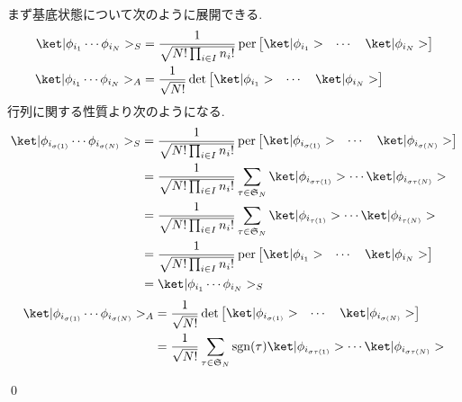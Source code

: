 \documentclass[uplatex,dvipdfmx,a4paper,11pt]{jlreq}
\makeatletter
\DeclareMathOperator{\sgn}{sgn}
\DeclareMathOperator{\per}{per}
\DeclareMathOperator{\Det}{det}
\renewcommand{\SS}{\mathfrak{S}}
\numberwithin{equation}{section}
\theoremstyle{definition}
\renewenvironment{proof}[1][\proofname]{\par
  \normalfont
  \topsep6\p@\@plus6\p@ \trivlist
  \item[\hskip\labelsep{\bfseries #1}\@addpunct{\bfseries}]\ignorespaces\quad\par
}{
  \qed\endtrivlist\@endpefalse
}
\renewcommand\proofname{証明}
\makeatother
\begin{document}
\begin{proof}
  まず基底状態について次のように展開できる.
  \begin{align}
    \ket|\phi_{i_1}\cdots\phi_{i_N}>_S & = \frac{1}{\sqrt{N!\prod_{i\in I}n_i!}}\per\begin{bmatrix}\ket|\phi_{i_1}> & \cdots & \ket|\phi_{i_N}>\end{bmatrix} \\
    \ket|\phi_{i_1}\cdots\phi_{i_N}>_A & = \frac{1}{\sqrt{N!}}\Det\begin{bmatrix}\ket|\phi_{i_1}> & \cdots & \ket|\phi_{i_N}>\end{bmatrix}
  \end{align}
  行列に関する性質より次のようになる.
  \begin{align}
    \ket|\phi_{i_{\sigma(1)}}\cdots\phi_{i_{\sigma(N)}}>_S & = \frac{1}{\sqrt{N!\prod_{i\in I}n_i!}}\per\begin{bmatrix}\ket|\phi_{i_{\sigma(1)}}> & \cdots & \ket|\phi_{i_{\sigma(N)}}>\end{bmatrix} \\
                                                           & = \frac{1}{\sqrt{N!\prod_{i\in I}n_i!}}\sum_{\tau\in\SS_N}\ket|\phi_{i_{\sigma\tau(1)}}>\cdots\ket|\phi_{i_{\sigma\tau(N)}}>                                              \\
                                                           & = \frac{1}{\sqrt{N!\prod_{i\in I}n_i!}}\sum_{\tau\in\SS_N}\ket|\phi_{i_{\tau(1)}}>\cdots\ket|\phi_{i_{\tau(N)}}>                                                          \\
                                                           & = \frac{1}{\sqrt{N!\prod_{i\in I}n_i!}}\per\begin{bmatrix}\ket|\phi_{i_1}> & \cdots & \ket|\phi_{i_N}>\end{bmatrix}                                                       \\
                                                           & = \ket|\phi_{i_1}\cdots\phi_{i_N}>_S
  \end{align}
  \begin{align}
    \ket|\phi_{i_{\sigma(1)}}\cdots\phi_{i_{\sigma(N)}}>_A & = \frac{1}{\sqrt{N!}}\Det\begin{bmatrix}\ket|\phi_{i_{\sigma(1)}}> & \cdots & \ket|\phi_{i_{\sigma(N)}}>\end{bmatrix} \\
                                                           & = \frac{1}{\sqrt{N!}}\sum_{\tau\in\SS_N}\sgn(\tau)\ket|\phi_{i_{\sigma\tau(1)}}>\cdots\ket|\phi_{i_{\sigma\tau(N)}}>                                    \\

\end{align}
\end{proof}
\end{document}
